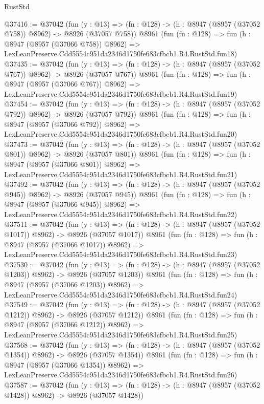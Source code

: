 \begin{lexlean}{RustStd}
\begin{coremodule}
@37416 := @37042
    (fun (y : @13) => (fn : @128) -> (h : @8947 (@8957 (@37052 @758)) @8962) -> @8926 (@37057 @758))
    @8961
    (fun (fn : @128) =>
    fun (h : @8947 (@8957 (@37066 @758)) @8962) =>
    LexLeanPreserve.Cdd5554c951da2346d1750fe683cfbcb1.R4.RustStd.fun18)
@37435 := @37042
    (fun (y : @13) => (fn : @128) -> (h : @8947 (@8957 (@37052 @767)) @8962) -> @8926 (@37057 @767))
    @8961
    (fun (fn : @128) =>
    fun (h : @8947 (@8957 (@37066 @767)) @8962) =>
    LexLeanPreserve.Cdd5554c951da2346d1750fe683cfbcb1.R4.RustStd.fun19)
@37454 := @37042
    (fun (y : @13) => (fn : @128) -> (h : @8947 (@8957 (@37052 @792)) @8962) -> @8926 (@37057 @792))
    @8961
    (fun (fn : @128) =>
    fun (h : @8947 (@8957 (@37066 @792)) @8962) =>
    LexLeanPreserve.Cdd5554c951da2346d1750fe683cfbcb1.R4.RustStd.fun20)
@37473 := @37042
    (fun (y : @13) => (fn : @128) -> (h : @8947 (@8957 (@37052 @801)) @8962) -> @8926 (@37057 @801))
    @8961
    (fun (fn : @128) =>
    fun (h : @8947 (@8957 (@37066 @801)) @8962) =>
    LexLeanPreserve.Cdd5554c951da2346d1750fe683cfbcb1.R4.RustStd.fun21)
@37492 := @37042
    (fun (y : @13) => (fn : @128) -> (h : @8947 (@8957 (@37052 @945)) @8962) -> @8926 (@37057 @945))
    @8961
    (fun (fn : @128) =>
    fun (h : @8947 (@8957 (@37066 @945)) @8962) =>
    LexLeanPreserve.Cdd5554c951da2346d1750fe683cfbcb1.R4.RustStd.fun22)
@37511 := @37042
    (fun (y : @13) =>
    (fn : @128) -> (h : @8947 (@8957 (@37052 @1017)) @8962) -> @8926 (@37057 @1017))
    @8961
    (fun (fn : @128) =>
    fun (h : @8947 (@8957 (@37066 @1017)) @8962) =>
    LexLeanPreserve.Cdd5554c951da2346d1750fe683cfbcb1.R4.RustStd.fun23)
@37530 := @37042
    (fun (y : @13) =>
    (fn : @128) -> (h : @8947 (@8957 (@37052 @1203)) @8962) -> @8926 (@37057 @1203))
    @8961
    (fun (fn : @128) =>
    fun (h : @8947 (@8957 (@37066 @1203)) @8962) =>
    LexLeanPreserve.Cdd5554c951da2346d1750fe683cfbcb1.R4.RustStd.fun24)
@37549 := @37042
    (fun (y : @13) =>
    (fn : @128) -> (h : @8947 (@8957 (@37052 @1212)) @8962) -> @8926 (@37057 @1212))
    @8961
    (fun (fn : @128) =>
    fun (h : @8947 (@8957 (@37066 @1212)) @8962) =>
    LexLeanPreserve.Cdd5554c951da2346d1750fe683cfbcb1.R4.RustStd.fun25)
@37568 := @37042
    (fun (y : @13) =>
    (fn : @128) -> (h : @8947 (@8957 (@37052 @1354)) @8962) -> @8926 (@37057 @1354))
    @8961
    (fun (fn : @128) =>
    fun (h : @8947 (@8957 (@37066 @1354)) @8962) =>
    LexLeanPreserve.Cdd5554c951da2346d1750fe683cfbcb1.R4.RustStd.fun26)
@37587 := @37042
    (fun (y : @13) =>
    (fn : @128) -> (h : @8947 (@8957 (@37052 @1428)) @8962) -> @8926 (@37057 @1428))

\end{coremodule}
\end{lexlean}
